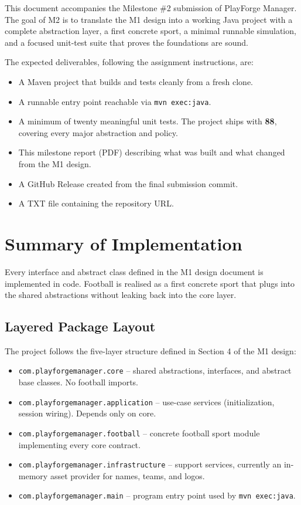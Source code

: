 \documentclass[11pt, a4paper]{article}
\newcommand{\code}[1]{\texttt{#1}}
\begin{document}
This document accompanies the Milestone \#2 submission of PlayForge Manager.
The goal of M2 is to translate the M1 design into a working Java project
with a complete abstraction layer, a first concrete sport,
a minimal runnable simulation, and a focused unit-test suite that proves
the foundations are sound.

The expected deliverables, following the assignment instructions, are:
\begin{itemize}
    \item A Maven project that builds and tests cleanly from a fresh clone.
    \item A runnable entry point reachable via \code{mvn exec:java}.
    \item A minimum of twenty meaningful unit tests. The project ships with
          \textbf{88}, covering every major abstraction and policy.
    \item This milestone report (PDF) describing what was built and what
          changed from the M1 design.
    \item A GitHub Release created from the final submission commit.
    \item A TXT file containing the repository URL.
\end{itemize}

\section{Summary of Implementation}

Every interface and abstract class defined in the M1 design document is
implemented in code. Football is realised as a first concrete sport that
plugs into the shared abstractions without leaking back into the core layer.

\subsection{Layered Package Layout}

The project follows the five-layer structure defined in Section 4 of the
M1 design:

\begin{itemize}
    \item \code{com.playforgemanager.core} -- shared abstractions, interfaces,
          and abstract base classes. No football imports.
    \item \code{com.playforgemanager.application} -- use-case services
          (initialization, session wiring). Depends only on core.
    \item \code{com.playforgemanager.football} -- concrete football sport
          module implementing every core contract.
    \item \code{com.playforgemanager.infrastructure} -- support services,
          currently an in-memory asset provider for names, teams, and logos.
    \item \code{com.playforgemanager.main} -- program entry point used by
          \code{mvn exec:java}.
\end{itemize}
\end{document}
